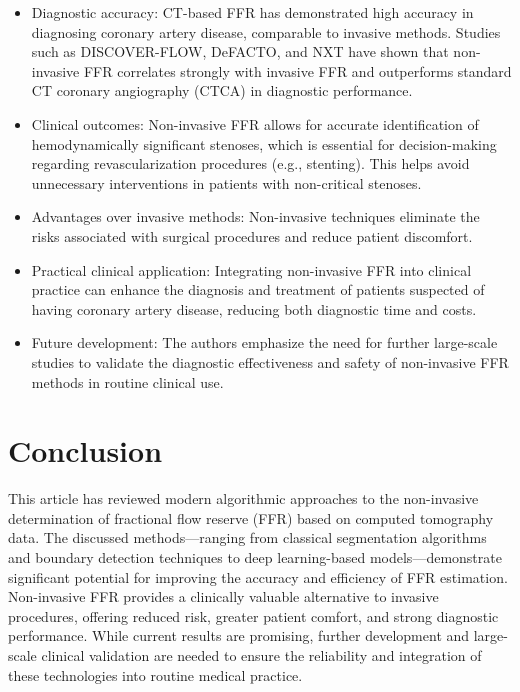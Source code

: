 \documentclass[default]{subfiles}
\begin{document}
\begin{itemize}
\item Diagnostic accuracy: CT-based FFR has demonstrated high accuracy in diagnosing coronary artery disease,
comparable to invasive methods. Studies such as DISCOVER-FLOW, DeFACTO, and NXT have shown that non-invasive FFR
correlates strongly with invasive FFR and outperforms standard CT coronary angiography (CTCA) in diagnostic
performance.

\item Clinical outcomes: Non-invasive FFR allows for accurate identification of hemodynamically significant stenoses,
which is essential for decision-making regarding revascularization procedures (e.g., stenting). This helps avoid
unnecessary interventions in patients with non-critical stenoses.

\item Advantages over invasive methods: Non-invasive techniques eliminate the risks associated with surgical procedures
and reduce patient discomfort.

\item Practical clinical application: Integrating non-invasive FFR into clinical practice can enhance the diagnosis and
treatment of patients suspected of having coronary artery disease, reducing both diagnostic time and costs.

\item Future development: The authors emphasize the need for further large-scale studies to validate the diagnostic
effectiveness and safety of non-invasive FFR methods in routine clinical use.
\end{itemize}

\section{Conclusion}

This article has reviewed modern algorithmic approaches to the non-invasive determination of fractional flow reserve
(FFR) based on computed tomography data. The discussed methods—ranging from classical segmentation algorithms and
boundary detection techniques to deep learning-based models—demonstrate significant potential for improving the
accuracy and efficiency of FFR estimation. Non-invasive FFR provides a clinically valuable alternative to invasive
procedures, offering reduced risk, greater patient comfort, and strong diagnostic performance. While current results
are promising, further development and large-scale clinical validation are needed to ensure the reliability and
integration of these technologies into routine medical practice.
\end{document}
